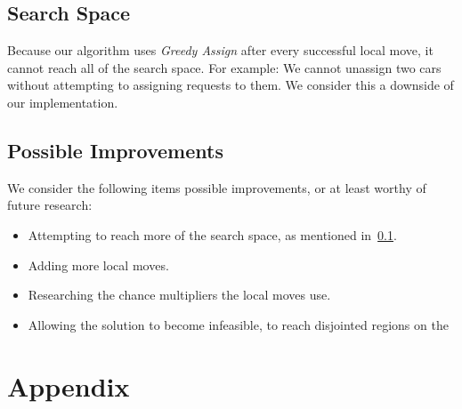 \documentclass[11pt,a4paper]{article}
\begin{document}
    \subsection{Search Space}\label{subsec:search-space}
        Because our algorithm uses \textit{Greedy Assign} after every successful local move, it cannot reach all of the search space.
        For example: We cannot unassign two cars without attempting to assigning requests to them.
        We consider this a downside of our implementation.

    \subsection{Possible Improvements}\label{subsec:possible-improvements}
        We consider the following items possible improvements, or at least worthy of future research:
        \begin{itemize} \itemsep-0.25em
            \item Attempting to reach more of the search space, as mentioned in~\ref{subsec:search-space}.
            \item Adding more local moves.
            \item Researching the chance multipliers the local moves use.
            \item Allowing the solution to become infeasible, to reach disjointed regions on the
        \end{itemize}


\pagebreak\section{Appendix}\label{sec:appendix}
\end{document}
